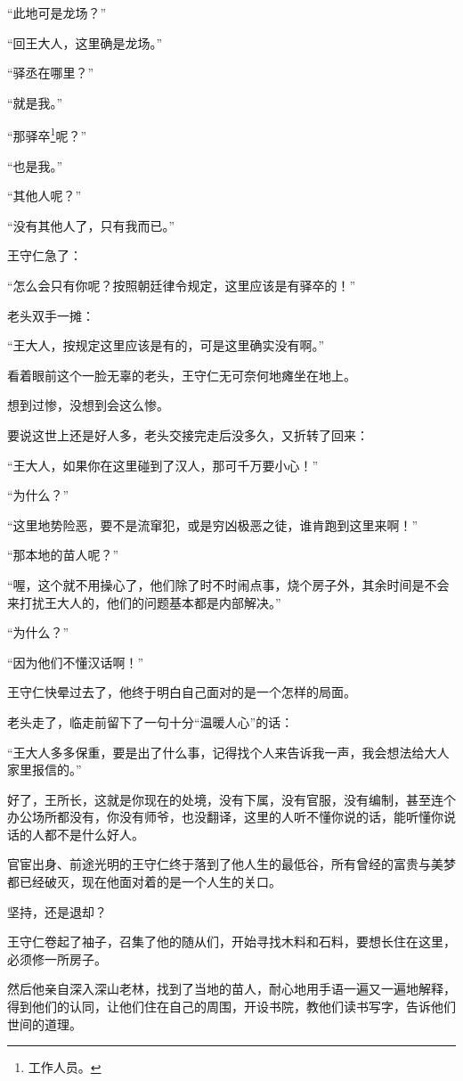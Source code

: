 \begin{multicols}{\theparacolNo}
		“此地可是龙场？”

		“回王大人，这里确是龙场。”

		“驿丞在哪里？”

		“就是我。”

		“那驿卒\footnote{工作人员。}呢？”

		“也是我。”

		“其他人呢？”

		“没有其他人了，只有我而已。”

		王守仁急了：

		“怎么会只有你呢？按照朝廷律令规定，这里应该是有驿卒的！”

		老头双手一摊：

		“王大人，按规定这里应该是有的，可是这里确实没有啊。”

		看着眼前这个一脸无辜的老头，王守仁无可奈何地瘫坐在地上。

		想到过惨，没想到会这么惨。

		要说这世上还是好人多，老头交接完走后没多久，又折转了回来：

		“王大人，如果你在这里碰到了汉人，那可千万要小心！”

		“为什么？”

		“这里地势险恶，要不是流窜犯，或是穷凶极恶之徒，谁肯跑到这里来啊！”

		“那本地的苗人呢？”

		“喔，这个就不用操心了，他们除了时不时闹点事，烧个房子外，其余时间是不会来打扰王大人的，他们的问题基本都是内部解决。”

		“为什么？”

		“因为他们不懂汉话啊！”

		王守仁快晕过去了，他终于明白自己面对的是一个怎样的局面。

		老头走了，临走前留下了一句十分“温暖人心”的话：

		“王大人多多保重，要是出了什么事，记得找个人来告诉我一声，我会想法给大人家里报信的。”

		好了，王所长，这就是你现在的处境，没有下属，没有官服，没有编制，甚至连个办公场所都没有，你没有师爷，也没翻译，这里的人听不懂你说的话，能听懂你说话的人都不是什么好人。

		官宦出身、前途光明的王守仁终于落到了他人生的最低谷，所有曾经的富贵与美梦都已经破灭，现在他面对着的是一个人生的关口。

		坚持，还是退却？

		王守仁卷起了袖子，召集了他的随从们，开始寻找木料和石料，要想长住在这里，必须修一所房子。

		然后他亲自深入深山老林，找到了当地的苗人，耐心地用手语一遍又一遍地解释，得到他们的认同，让他们住在自己的周围，开设书院，教他们读书写字，告诉他们世间的道理。


\end{multicols}

